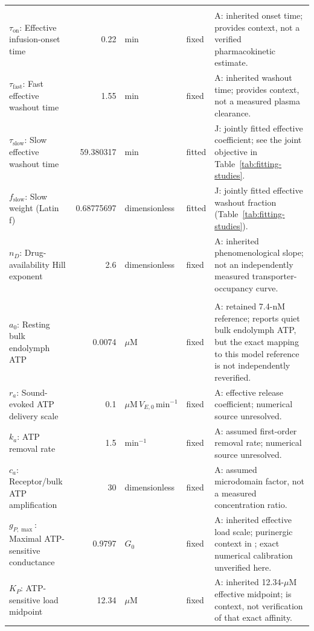 \begin{longtable}{@{}>{\raggedright\arraybackslash}p{4.4cm}r>{\raggedright\arraybackslash}p{2.0cm}>{\raggedright\arraybackslash}p{1.0cm}>{\raggedright\arraybackslash}p{8.0cm}@{}}
\addlinespace[4pt]\multicolumn{5}{@{}l}{\textbf{Effective drug kinetics}}\\*
\(\tau_{\mathrm{on}}\): Effective infusion-onset time & 0.22 & min & fixed & A: inherited onset time; \citet{PikeBosher1980} provides context, not a verified pharmacokinetic estimate. \\
\(\tau_{\mathrm{fast}}\): Fast effective washout time & 1.55 & min & fixed & A: inherited washout time; \citet{PikeBosher1980} provides context, not a measured plasma clearance. \\
\(\tau_{\mathrm{slow}}\): Slow effective washout time & 59.380317 & min & fitted & J: jointly fitted effective coefficient; see the joint objective in Table~\ref{tab:fitting-studies}. \\
\(f_{\mathrm{slow}}\): Slow weight (Latin f) & 0.68775697 & dimensionless & fitted & J: jointly fitted effective washout fraction (Table~\ref{tab:fitting-studies}). \\
\(n_D\): Drug-availability Hill exponent & 2.6 & dimensionless & fixed & A: inherited phenomenological slope; not an independently measured transporter-occupancy curve. \\
\addlinespace[4pt]\multicolumn{5}{@{}l}{\textbf{Extracellular ATP and effective purinergic load}}\\*
\(a_0\): Resting bulk endolymph ATP & 0.0074 & \(\mu\mathrm{M}\) & fixed & A: retained 7.4-nM reference; \citet{Munoz2001} reports quiet bulk endolymph ATP, but the exact mapping to this model reference is not independently reverified. \\
\(r_a\): Sound-evoked ATP delivery scale & 0.1 & \(\mu\mathrm{M}\,V_{E,0}\,\mathrm{min}^{-1}\) & fixed & A: effective release coefficient; numerical source unresolved. \\
\(k_a\): ATP removal rate & 1.5 & min\(^{-1}\) & fixed & A: assumed first-order removal rate; numerical source unresolved. \\
\(c_a\): Receptor/bulk ATP amplification & 30 & dimensionless & fixed & A: assumed microdomain factor, not a measured concentration ratio. \\
\(g_{P,\max}\): Maximal ATP-sensitive conductance & 0.9797 & \(G_0\) & fixed & A: inherited effective load scale; purinergic context in \citet{Housley2013}; exact numerical calibration unverified here. \\
\(K_P\): ATP-sensitive load midpoint & 12.34 & \(\mu\mathrm{M}\) & fixed & A: inherited 12.34-\(\mu\)M effective midpoint; \citet{Housley2013} is context, not verification of that exact affinity. \\

\end{longtable}
